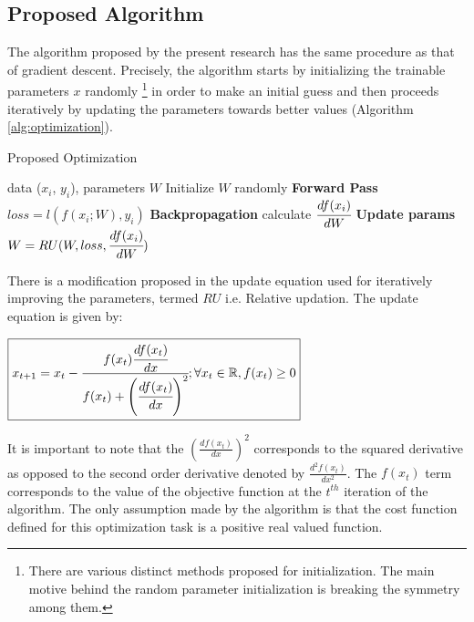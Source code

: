 \documentclass{article}
\begin{document}
\subsection{Proposed Algorithm}
The algorithm proposed by the present research has the same procedure as that of gradient descent. Precisely, the algorithm starts by initializing the trainable parameters $x$ randomly \footnote{There are various distinct methods proposed for initialization. The main motive behind the random parameter initialization is breaking the symmetry among them.} in order to make an initial guess and then proceeds iteratively by updating the parameters towards better values (Algorithm \ref{alg:optimization}).

\begin{algorithm}[!htb]
   \caption{Proposed Optimization}
   \label{alg:optimization}
\begin{algorithmic}
    data ($x_i$, $y_i$), parameters $W$
   \STATE Initialize $W$ randomly
   \REPEAT
   \STATE \textbf{Forward Pass} $loss = l(f(x_i; W), y_i)$
   \STATE \textbf{Backpropagation} calculate $\cfrac{df(x_i)}{dW}$
   \STATE \textbf{Update params} $W = RU(W, loss, \cfrac{df(x_i)}{dW})$
\end{algorithmic}
\end{algorithm}

There is a modification proposed in the update equation used for iteratively improving the parameters, termed $RU$ i.e. Relative updation. The update equation is given by:

\begin{center}	
	$\boxed{x_{t + 1} = x_{t}  - \cfrac{f(x_t) \cfrac{df(x_t)}{dx}}{f(x_t) + \left(\cfrac{df(x_t)}{dx}\right)^2}; \forall x_t \in \mathbb{R}, f(x_t) \geq 0 }$
	
\end{center}

It is important to note that the $\left(\frac{df(x_t)}{dx}\right)^2$ corresponds to the squared derivative as opposed to the second order derivative denoted by $\frac{d^2f(x_t)}{dx^2}$. The $f(x_t)$ term corresponds to the value of the objective function at the $t^{th}$ iteration of the algorithm. The only assumption made by the algorithm is that the cost function defined for this optimization task is a positive real valued function.
\end{document}
